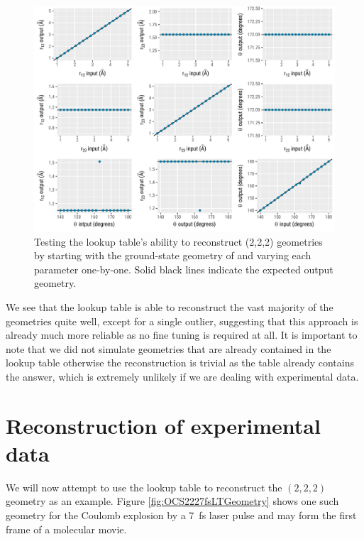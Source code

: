 \begin{figure}
  \centering
  \includegraphics[width=\textwidth]{Plots/LookupTableCalibrationPlots}
  \caption[Testing the Lookup table's ability to reconstruct  (2,2,2) geometries.]
  {Testing the lookup table's ability to reconstruct  (2,2,2) geometries by starting with the ground-state geometry of  and varying each parameter one-by-one. Solid black lines indicate the expected output geometry.}
  \label{fig:LookupTableCalibrationPlots}
\end{figure}

We see that the lookup table is able to reconstruct the vast majority of the geometries quite well, except for a single outlier, suggesting that this approach is already much more reliable as no fine tuning is required at all. It is important to note that we did not simulate geometries that are already contained in the lookup table otherwise the reconstruction is trivial as the table already contains the answer, which is extremely unlikely if we are dealing with experimental data.

\section{Reconstruction of experimental data} \label{sec:LTgeometries}


We will now attempt to use the lookup table to reconstruct the  $(2,2,2)$ geometry as an example. Figure \ref{fig:OCS2227fsLTGeometry} shows one such geometry for the Coulomb explosion by a \SI{7}{\femto\s} laser pulse and may form the first frame of a molecular movie.


